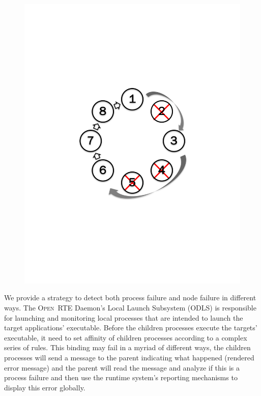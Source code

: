 \documentclass[sigconf]{acmart}
\newcommand{\orte}[0]{\textsc{Open~RTE}\xspace}
\begin{document}
\begin{figure}
\begin{minipage}{.23\textwidth}
  \includegraphics[trim=3cm 8.0cm 3cm 8cm,width=\linewidth]{reconnet_cross.pdf}
  \label{fig:Reconnect Ring}
\end{minipage}
\end{figure}
We provide a strategy to detect both process failure and node failure in different ways. The \orte Daemon's Local Launch Subsystem (ODLS) is responsible for launching and monitoring local processes that are intended to launch the target applications' executable. Before the children processes execute the targets' executable, it need to set affinity of children processes according to a complex series of rules. This binding may fail in a myriad of different ways, the children processes will send a message to the parent indicating what happened (rendered error message) and the parent will read the message and analyze if this is a process failure and then use the runtime system's reporting mechanisms to display this error globally. 
\end{document}
